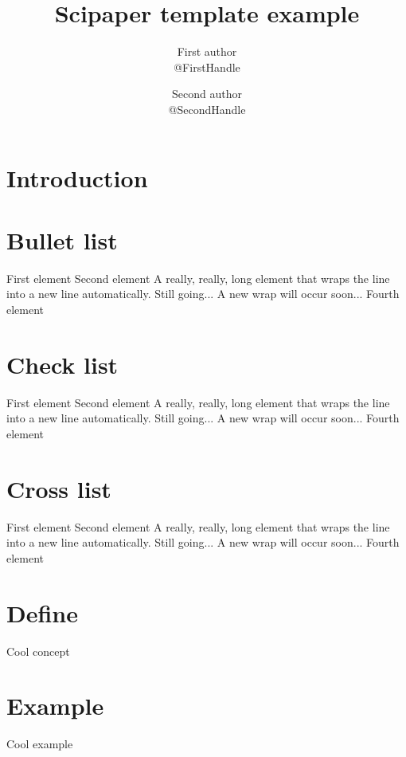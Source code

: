 \documentclass{scipaper}
\title{Scipaper template example}
\author{
	First author\\\small @FirstHandle
	\and
	Second author\\\small @SecondHandle
}
\begin{document}
	\maketitle
	
	\begin{strip}
		\lipsum[1]
	\end{strip}
	
	\begin{abstract}
		\lipsum[2-3]
	\end{abstract}

	\tableofcontents

	\section{Introduction}
	\lipsum[4-7]
	\section{Bullet list}
	\begin{bulletlist}
		First element
		Second element
		A really, really, long element that wraps the line into a new line automatically. Still going... A new wrap will occur soon...
		Fourth element
	\end{bulletlist}
	\section{Check list}
	\begin{checklist}
		First element
		Second element
		A really, really, long element that wraps the line into a new line automatically. Still going... A new wrap will occur soon...
		Fourth element
	\end{checklist}
	\section{Cross list}
	\begin{crosslist}
		First element
		Second element
		A really, really, long element that wraps the line into a new line automatically. Still going... A new wrap will occur soon...
		Fourth element
	\end{crosslist}
	\section{Define}
	\begin{define}{Cool concept}
		\lipsum[1]
	\end{define}
	\section{Example}
	\begin{example}{Cool example}
		\lipsum[1]
	\end{example}
\end{document}
